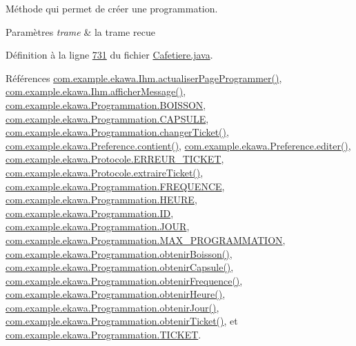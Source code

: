 Méthode qui permet de créer une programmation. 


\begin{DoxyParams}{Paramètres}
{\em trame} & la trame recue \\
\hline
\end{DoxyParams}


Définition à la ligne \hyperlink{_cafetiere_8java_source_l00731}{731} du fichier \hyperlink{_cafetiere_8java_source}{Cafetiere.\+java}.



Références \hyperlink{_ihm_8java_source_l00938}{com.\+example.\+ekawa.\+Ihm.\+actualiser\+Page\+Programmer()}, \hyperlink{_ihm_8java_source_l00964}{com.\+example.\+ekawa.\+Ihm.\+afficher\+Message()}, \hyperlink{_programmation_8java_source_l00027}{com.\+example.\+ekawa.\+Programmation.\+B\+O\+I\+S\+S\+ON}, \hyperlink{_programmation_8java_source_l00026}{com.\+example.\+ekawa.\+Programmation.\+C\+A\+P\+S\+U\+LE}, \hyperlink{_programmation_8java_source_l00178}{com.\+example.\+ekawa.\+Programmation.\+changer\+Ticket()}, \hyperlink{_preference_8java_source_l00087}{com.\+example.\+ekawa.\+Preference.\+contient()}, \hyperlink{_preference_8java_source_l00100}{com.\+example.\+ekawa.\+Preference.\+editer()}, \hyperlink{_protocole_8java_source_l00091}{com.\+example.\+ekawa.\+Protocole.\+E\+R\+R\+E\+U\+R\+\_\+\+T\+I\+C\+K\+ET}, \hyperlink{_protocole_8java_source_l00423}{com.\+example.\+ekawa.\+Protocole.\+extraire\+Ticket()}, \hyperlink{_programmation_8java_source_l00030}{com.\+example.\+ekawa.\+Programmation.\+F\+R\+E\+Q\+U\+E\+N\+CE}, \hyperlink{_programmation_8java_source_l00029}{com.\+example.\+ekawa.\+Programmation.\+H\+E\+U\+RE}, \hyperlink{_programmation_8java_source_l00025}{com.\+example.\+ekawa.\+Programmation.\+ID}, \hyperlink{_programmation_8java_source_l00028}{com.\+example.\+ekawa.\+Programmation.\+J\+O\+UR}, \hyperlink{_programmation_8java_source_l00023}{com.\+example.\+ekawa.\+Programmation.\+M\+A\+X\+\_\+\+P\+R\+O\+G\+R\+A\+M\+M\+A\+T\+I\+ON}, \hyperlink{_programmation_8java_source_l00133}{com.\+example.\+ekawa.\+Programmation.\+obtenir\+Boisson()}, \hyperlink{_programmation_8java_source_l00124}{com.\+example.\+ekawa.\+Programmation.\+obtenir\+Capsule()}, \hyperlink{_programmation_8java_source_l00160}{com.\+example.\+ekawa.\+Programmation.\+obtenir\+Frequence()}, \hyperlink{_programmation_8java_source_l00151}{com.\+example.\+ekawa.\+Programmation.\+obtenir\+Heure()}, \hyperlink{_programmation_8java_source_l00142}{com.\+example.\+ekawa.\+Programmation.\+obtenir\+Jour()}, \hyperlink{_programmation_8java_source_l00169}{com.\+example.\+ekawa.\+Programmation.\+obtenir\+Ticket()}, et \hyperlink{_programmation_8java_source_l00031}{com.\+example.\+ekawa.\+Programmation.\+T\+I\+C\+K\+ET}.



